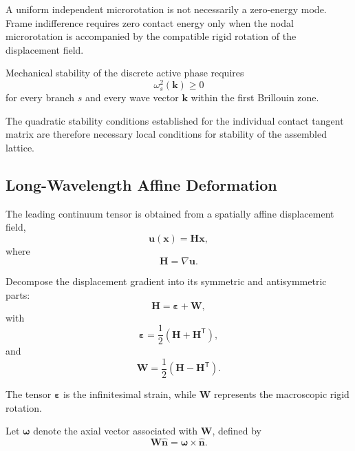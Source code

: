 A uniform independent microrotation is not necessarily a zero-energy mode. Frame indifference requires zero contact energy only when the nodal microrotation is accompanied by the compatible rigid rotation of the displacement field.

Mechanical stability of the discrete active phase requires
\begin{equation}
    \boxed{ \omega_s^2(\mathbf{k}) \geq 0 }
\end{equation}
for every branch $s$ and every wave vector $\mathbf{k}$ within the first Brillouin zone.

The quadratic stability conditions established for the individual contact tangent matrix are therefore necessary local conditions for stability of the assembled lattice.

\subsection{Long-Wavelength Affine Deformation}

The leading continuum tensor is obtained from a spatially affine displacement field,
\begin{equation}
    \mathbf{u}(\mathbf{x}) = \mathbf{H}\mathbf{x},
\end{equation}
where
\begin{equation}
    \mathbf{H} = \nabla\mathbf{u}.
\end{equation}

Decompose the displacement gradient into its symmetric and antisymmetric parts:
\begin{equation}
    \mathbf{H} = \boldsymbol{\varepsilon} + \mathbf{W},
\end{equation}
with
\begin{equation}
    \boldsymbol{\varepsilon} = \frac{1}{2} \left( \mathbf{H}+\mathbf{H}^{\mathsf{T}} \right),
\end{equation}
and
\begin{equation}
    \mathbf{W} = \frac{1}{2} \left( \mathbf{H}-\mathbf{H}^{\mathsf{T}} \right).
\end{equation}

The tensor $\boldsymbol{\varepsilon}$ is the infinitesimal strain, while $\mathbf{W}$ represents the macroscopic rigid rotation.

Let $\boldsymbol{\omega}$ denote the axial vector associated with $\mathbf{W}$, defined by
\begin{equation}
    \mathbf{W}\hat{\mathbf{n}} = \boldsymbol{\omega}\times\hat{\mathbf{n}}.
\end{equation}

